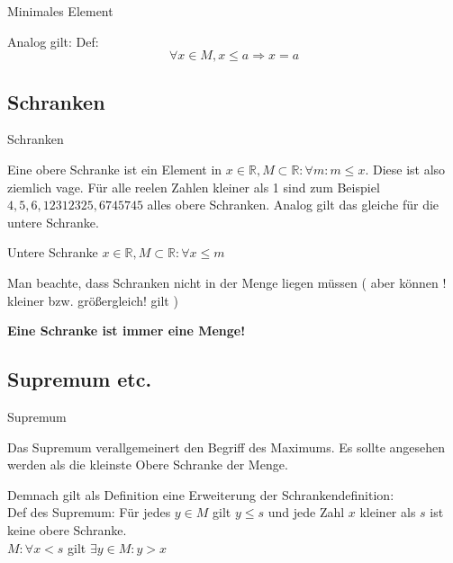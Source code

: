 \documentclass[smallheadings,headsepline,12pt,a4paper]{scrartcl}
\begin{document}
\begin{center}
\item[Minimales Element]
\end{center}
\item Analog gilt: Def: $$ \forall x \in M, x \leq a \Rightarrow x = a $$

\newpage

\subsection*{Schranken}

\begin{center}
\item[Schranken]
\end{center}
\item Eine obere Schranke ist ein Element in $ x \in \mathbb{R}, M \subset \mathbb{R} : \forall m : m \leq x $. Diese ist also ziemlich vage. Für alle reelen Zahlen kleiner als 1 sind zum Beispiel $ 4,5,6,12312325,6745745 $ alles obere Schranken. Analog gilt das gleiche für die untere Schranke.
\item Untere Schranke $ x \in \mathbb{R}, M \subset \mathbb{R} : \forall x \leq m $
\item Man beachte, dass Schranken nicht in der Menge liegen müssen ( aber können ! kleiner bzw. größergleich! gilt )
\item \textbf{Eine Schranke ist immer eine Menge!}

\subsection*{Supremum etc.}

\begin{center}
\item[Supremum]
\end{center}
\item Das Supremum verallgemeinert den Begriff des Maximums. Es sollte angesehen werden als die kleinste Obere Schranke der Menge.
\item Demnach gilt als Definition eine Erweiterung der Schrankendefinition:\\

Def des Supremum:
Für jedes $ y \in M $ gilt $ y \leq s $
und jede Zahl $x$ kleiner als $s$ ist keine obere Schranke. \\
$ M: \forall x < s $ gilt $ \exists y \in M : y > x $ \\
\end{document}
